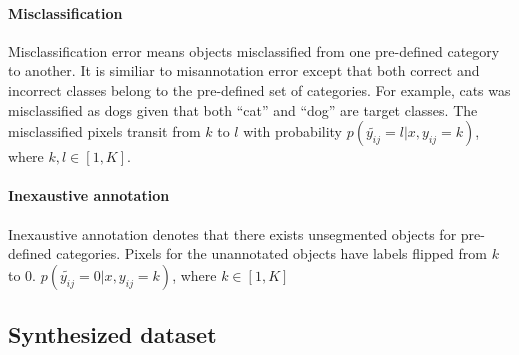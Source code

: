 \paragraph{Misclassification}
Misclassification error means objects misclassified from one pre-defined category to another.
It is similiar to misannotation error except that both correct and incorrect classes belong to the pre-defined set of categories.
For example, cats was misclassified as dogs given that both ``cat'' and ``dog'' are target classes.
The misclassified pixels transit from $k$ to $l$ with probability $p(\tilde{y_{ij}}=l\vert x, y_{ij}=k)$, where $k,l \in [1, K]$.


\noindent
\paragraph{Inexaustive annotation}
Inexaustive annotation denotes that there exists unsegmented objects for pre-defined categories.
Pixels for the unannotated objects have labels flipped from $k$ to $0$.
$p(\tilde{y_{ij}}=0\vert x, y_{ij}=k)$, where $k \in [1,K]$





\subsection{Synthesized dataset}
\label{subsec:robustness}

